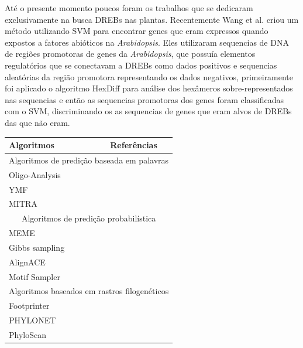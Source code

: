 Até o presente momento poucos foram os trabalhos que se dedicaram exclusivamente na busca DREBs nas plantas. Recentemente Wang et al. \cite{Wang2009} criou um método utilizando SVM para encontrar genes que eram expressos quando expostos a fatores abióticos na \textit{Arabidopsis}. Eles utilizaram sequencias de DNA de regiões promotoras de genes da \textit{Arabidopsis}, que possuía elementos regulatórios que se conectavam a DREBs como dados positivos e sequencias aleatórias da região promotora representando os dados negativos, primeiramente foi aplicado o algoritmo HexDiff \cite{Chan2005} para análise dos hexâmeros sobre-representados nas sequencias e então as sequencias promotoras dos genes foram classificadas com o SVM, discriminando os as sequencias de genes que eram alvos de DREBs das que não eram.


\begin{table}[h!]
\begin{center}
  \begin{tabular}{| l | c | }
    \hline
    Algoritmos     & Referências       \\ \hline \hline

    \multicolumn{2}{|c|}{Algoritmos de predição baseada em palavras}  \\ \hline

    Oligo-Analysis & \cite{Helden1998} \\ \hline
    YMF            & \cite{Sinha2003}  \\ \hline
    MITRA          & \cite{Eskin2002}  \\ \hline

    \multicolumn{2}{|c|}{Algoritmos de predição probabilística}       \\ \hline

    MEME           & \cite{Bailey2006}   \\ \hline
    Gibbs sampling & \cite{Lawrence1993} \\ \hline
    AlignACE       & \cite{Roth1998}     \\ \hline
    Motif Sampler  & \cite{Thijs2002}    \\ \hline

    \multicolumn{2}{|c|}{Algoritmos baseados em rastros filogenéticos} \\ \hline

    Footprinter    & \cite{Blanchette2002} \\ \hline
    PHYLONET       & \cite{Wang2005}       \\ \hline
    PhyloScan      & \cite{Carmack2007}    \\ \hline


\end{tabular}
\end{center}
\end{table}
